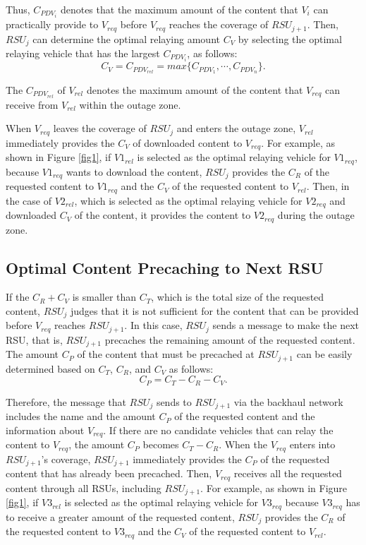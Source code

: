 \documentclass[electronics,aricle,accept,pdftex,moreauthors]{Definitions/mdpi}
\begin{document}
Thus, $C_{PDV_{i}}$ denotes that the maximum amount of the content that $V_{i}$ can practically provide to $V_{req}$ before $V_{req}$ reaches the coverage of $RSU_{j+1}$.
Then, $RSU_{j}$ can determine the optimal relaying amount ${C}_{V}$ by selecting the optimal relaying vehicle that has the largest $C_{PDV_{i}}$, as follows:
\begin{equation}
    {C}_{V}={C}_{{PDV}_{rel}}=max\{{C}_{{PDV}_{1}}, \cdots,{C}_{{PDV}_{n}}\}. %
\end{equation}

The ${C}_{{PDV}_{rel}}$ of ${V}_{rel}$ denotes the maximum amount of the content that $V_{req}$ can receive from $V_{rel}$ within the outage zone.

When $V_{req}$ leaves the coverage of $RSU_{j}$ and enters the outage zone, $V_{rel}$ immediately provides the $C_{V}$ of downloaded content to $V_{req}$.
For example, as shown in Figure \ref{fig1}, if $V1_{rel}$ is selected as the optimal relaying vehicle for $V1_{req}$, because $V1_{req}$ wants to download the content, $RSU_{j}$ provides the $C_{R}$ of the requested content to $V1_{req}$ and the $C_{V}$ of the requested content to $V_{rel}$.
Then, in the case of $V2_{rel}$, which is selected as the optimal relaying vehicle for $V2_{req}$ and downloaded $C_{V}$ of the content, it provides the content to $V2_{req}$ during the outage zone.


\subsection{Optimal Content Precaching to Next RSU} \label{sec3.3}
If the $C_{R}+C_{V}$ is smaller than $C_{T}$, which is the total size of the requested content, $RSU_{j}$ judges that it is not sufficient for the content that can be provided before $V_{req}$ reaches $RSU_{j+1}$.
In this case, $RSU_{j}$ sends a message to make the next RSU, that is, $RSU_{j+1}$ precaches the remaining amount of the requested content.
The amount $C_{P}$ of the content that must be precached at $RSU_{j+1}$ can be easily determined based on $C_{T}$, $C_{R}$, and $C_{V}$ as follows:
\begin{equation}
     {C}_{P}={C}_{T} - {C}_{R} - {C}_{V}.  %
\end{equation}

Therefore, the message that $RSU_{j}$ sends to $RSU_{j+1}$ via the backhaul network includes the name and the amount $C_{P}$ of the requested content and the information about $V_{req}$.
If there are no candidate vehicles that can relay the content to $V_{req}$, the amount $C_{P}$ becomes ${C}_{T} - {C}_{R}$.
When the $V_{req}$ enters into $RSU_{j+1}$'s coverage, ${RSU}_{j+1}$ immediately provides the $C_{P}$ of the requested content that has already been precached.
Then, $V_{req}$ receives all the requested content through all RSUs, including $RSU_{j+1}$.
For example, as shown in Figure \ref{fig1}, if $V3_{rel}$ is selected as the optimal relaying vehicle for $V3_{req}$ because $V3_{req}$ has to receive a greater amount of the requested content, $RSU_{j}$ provides the $C_{R}$ of the requested content to $V3_{req}$ and the $C_{V}$ of the requested content to $V_{rel}$.
\end{document}

